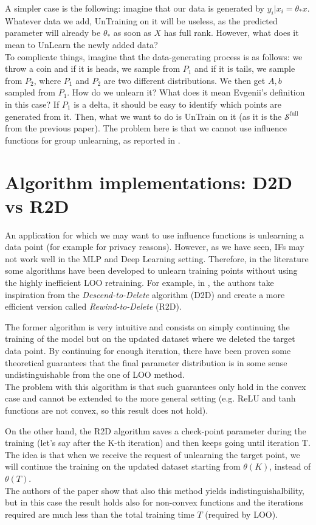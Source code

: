 {A simpler case is the following: imagine that our data is generated by $y_i|x_i = \theta_* x$.
Whatever data we add, UnTraining on it will be useless, as the predicted parameter will already be $\theta_*$ as soon as $X$ has full rank.
However, what does it mean to UnLearn the newly added data?
\\ \qst To complicate things, imagine that the data-generating process is as follows: we throw a coin and if it is heads, we sample from $P_1$ and if it is tails, we sample from $P_2$, where $P_1$ and $P_2$ are two different distributions.
We then get $A,b$ sampled from $P_1$. How do we unlearn it? What does it mean Evgenii's definition in this case?
If $P_1$ is a delta, it should be easy to identify which points are generated from it. Then, what we want to do is UnTrain on it (as it is the $\mathcal{S}^{\text{full}}$ from the previous paper). The problem here is that we cannot use influence functions for group unlearning, as reported in \cite{koh_accuracy_2019}.

}
\section*{Algorithm implementations: D2D vs R2D}
An application for which we may want to use influence functions is unlearning a data point (for example for privacy reasons).
However, as we have seen, IFs may not work well in the MLP and Deep Learning setting. 
Therefore, in the literature some algorithms have been developed to unlearn training points without using the highly inefficient LOO retraining.
For example, in \cite{mu_rewind--delete_2025}, the authors take inspiration from the \emph{Descend-to-Delete} algorithm (D2D) and create a more efficient version called \emph{Rewind-to-Delete} (R2D).

The former algorithm is very intuitive and consists on simply continuing the training of the model but on the updated dataset where we deleted the target data point.
By continuing for enough iteration, there have been proven some theoretical guarantees that the final parameter distribution is in some sense undistinguishable from the one of LOO method.\\
The problem with this algorithm is that such guarantees only hold in the convex case and cannot be extended to the more general setting (e.g. ReLU and tanh functions are not convex, so this result does not hold).

On the other hand, the R2D algorithm saves a check-point parameter during the training (let's say after the K-th iteration) and then keeps going until iteration T.
The idea is that when we receive the request of unlearning the target point, we will continue the training on the updated dataset starting from $\theta(K)$, instead of $\theta(T)$.\\
The authors of the paper show that also this method yields indistinguishalbility, but in this case the result holds also for non-convex functions and the iterations required are much less than the total training time $T$ (required by LOO).

